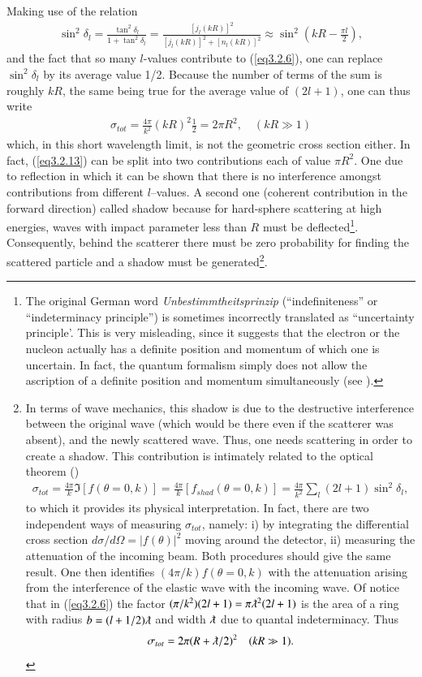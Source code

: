 Making use of the relation
\begin{align}\label{eq3.2.7}
\sin^2\delta_l=\frac{\tan^2\delta_l}{1+\tan^2\delta_l}=\frac{[j_l(kR)]^2}{[j_l(kR)]^2+[n_l(kR)]^2}\approx\sin^2\left(kR-\frac{\pi l}{2}\right),
\end{align}
and the fact that so many $l$-values contribute to (\ref{eq3.2.6}), one can replace $\sin^2\delta_l$ by its average value 1/2. Because the number of terms of the sum is roughly $kR$, the same being true for the average value of $(2l+1)$, one can thus write
\begin{align}\label{eq3.2.13}
\sigma_{tot}=\frac{4\pi}{k^2}(kR)^2\frac{1}{2}=2\pi R^2,\quad (kR\gg1)
\end{align}
which, in this short wavelength limit, is not the geometric cross section either. In fact, (\ref{eq3.2.13}) can be split into two contributions each of value $\pi R^2$. One due to reflection in which it can be shown that there is no interference amongst contributions from different $l$--values. A second one (coherent contribution in the forward direction) called shadow because for hard-sphere scattering at high energies, waves with impact parameter less than $R$ must be deflected\footnote{The original German word \textit{Unbestimmtheitsprinzip} (``indefiniteness'' or ``indeterminacy principle'') is sometimes incorrectly translated as ``uncertainty principle'. This is very misleading, since it suggests that the electron or the nucleon actually has a definite position and momentum of which one is uncertain. In fact, the quantum formalism simply does not allow the ascription of a definite position and momentum simultaneously (see \cite{Leggett:87}).}. Consequently, behind the scatterer there must be zero probability for finding the scattered particle and a shadow must be generated\footnote{In terms of wave mechanics, this shadow is due to the destructive interference between the original wave (which would be there even if the scatterer was absent), and the newly scattered wave. Thus, one needs scattering in order to create a shadow. This contribution is intimately related to the optical theorem (\cite{Sakurai:94})
\begin{align*}
\sigma_{tot}=\frac{4\pi}{k}\Im[f(\theta=0,k)]=\frac{4\pi}{k}[f_{shad}(\theta=0,k)]=\frac{4\pi}{k^2}\sum_l(2l+1)\sin^2\delta_l,
\end{align*}
to which it provides its physical interpretation. In fact,  there are two independent ways of measuring $\sigma_{tot}$, namely: i) by integrating the differential cross section $d\sigma/d\Omega=|f(\theta)|^2$ moving around the detector, ii) measuring the attenuation of the incoming beam. Both procedures should give the same result. One then identifies $(4\pi/k)f(\theta=0,k)$ with the attenuation arising from the interference of the elastic wave with the incoming wave. Of notice that in (\ref{eq3.2.6}) the factor $(\pi/k^2)(2l+1)=\pi\lambdabar^2(2l+1)$ is the area of a ring  with radius $b=(l+1/2)\lambdabar$ and width $\lambdabar$ due to quantal indeterminacy. Thus
\begin{align*}
\sigma_{tot}=2\pi(R+\lambdabar/2)^2\quad(kR\gg1).
\end{align*}}.
